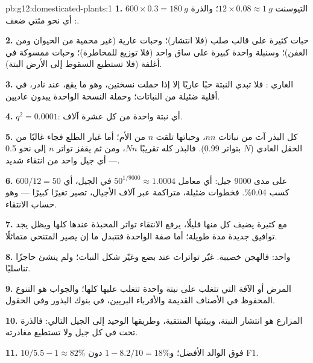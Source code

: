 \begin{solution}{pb:g12:domesticated-plants:1}
\textbf{1.} التيوسنت $12 \times 0.08 \approx \qty{1}{g}$؛ والذرة $600
\times 0.3 = \qty{180}{g}$: أي نحو مئتي ضعف.

\textbf{2.} حبات كثيرة على قالب صلب (فلا انتشار)؛ وحبات عارية (غير
محمية من الحيوان ومن العفن)؛ وسنبلة واحدة كبيرة على ساق واحد (فلا
توزيع للمخاطرة)؛ وحبات ممسوكة في أغلفة (فلا تستطيع السقوط إلى الأرض
البتة).

\textbf{3.}  العاري : فلا تبدي النبتة حبًا عاريًا إلا إذا
حملت نسختين، وهو ما يقع، عند  نادر، في أقلية ضئيلة من النباتات؛
وحملة النسخة الواحدة يبدون عاديين.

\textbf{4.} $q^2 = 0.0001$: أي نبتة واحدة من كل عشرة آلاف.

\textbf{5.} كل البذر آت من نباتات $nn$، وحباتها تلقت $n$ من الأم؛ أما
غبار الطلع فجاء غالبًا من الحقل العادي ($N$ بتواتر 0.99). فالبذر كله
تقريبًا $Nn$، ومن ثم يقفز تواتر $n$ إلى نحو 0.5 --- أي جيل واحد من
انتقاء شديد.

\textbf{6.} $600/12 = 50$ على مدى 9000 جيل: أي معامل $50^{1/9000}
\approx 1.0004$ في الجيل، أي كسب 0.04\%. فخطوات ضئيلة، متراكمة عبر
آلاف الأجيال، تصير تغيرًا كبيرًا --- وهو حساب الانتقاء.

\textbf{7.} مع  كثيرة يضيف كل منها قليلًا، يرفع الانتقاء تواتر
 المحبذة عندها كلها ويظل يجد توافيق جديدة مدة طويلة؛ أما صفة
 الواحدة فتتبدل ما إن يصير  المتنحي متماثلًا.

\textbf{8.}  واحد: فالهجن خصيبة.  غيّر تواترات  عند
بضع  وغيّر شكل النبات؛ ولم ينشئ حاجزًا تناسليًا.

\textbf{9.} المرض أو الآفة التي تتغلب على نبتة واحدة تتغلب عليها كلها؛
والجواب هو التنوع المحفوظ في الأصناف القديمة والأقرباء البريين، في
بنوك البذور وفي الحقول.

\textbf{10.} المزارع هو انتشار النبتة، وبيئتها المنتقية، وطريقها
الوحيد إلى الجيل التالي: فالذرة تحت  في كل جيل ولا
تستطيع مغادرته.

\textbf{11.} $10/5.5 - 1 \approx 82\%$ فوق الوالد الأفضل؛
و$1 - 8.2/10 = 18\%$ دون F1.


\end{solution}

